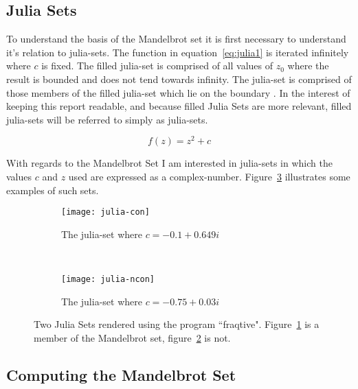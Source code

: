 \subsection*{Julia Sets}

To understand the basis of the Mandelbrot set it is first necessary to understand it's relation to \glspl{julia-set}.
The function in equation~\ref{eq:julia1} is iterated infinitely where \(c\) is fixed.
The \gls{filled julia-set} is comprised of all values of \(z_0\) where the result is bounded and does not tend towards infinity.
The \gls{julia-set} is comprised of those members of the \gls{filled julia-set} which lie on the boundary \cite{chaosfract}.
In the interest of keeping this report readable, and because filled Julia Sets are more relevant, \glspl{filled julia-set} will be 
referred to simply as \glspl{julia-set}.

\begin{equation}\label{eq:julia1}
f(z) = z^2 + c
\end{equation}

With regards to the Mandelbrot Set I am interested in \glspl{julia-set} in which the values \(c\) and \(z\) used are expressed as a 
\gls{complex-number}. Figure~\ref{fig:juliaimgs} illustrates some examples of such sets. 

\begin{figure}[h]
\centering
\begin{subfigure}[b]{0.48\textwidth}
  \centering    
  \texttt{[image: julia-con]}
  \caption{
    \tiny The \gls{julia-set} where \(c = -0.1 + 0.649i\)
  }
  \label{fig:juliaimgcon}
\end{subfigure}
~ %
\begin{subfigure}[b]{0.48\textwidth}
  \centering
  \texttt{[image: julia-ncon]}
  \caption{
    \tiny The \gls{julia-set} where \(c = -0.75 + 0.03i\)
  }
  \label{fig:juliaimgncon}
\end{subfigure}
\caption{
  Two Julia Sets rendered using the program ``fraqtive"\cite{fraqtive}. 
  Figure~\ref{fig:juliaimgcon} is a member of the Mandelbrot set, 
  figure~\ref{fig:juliaimgncon} is not.
}
\label{fig:juliaimgs}
\end{figure}

\subsection*{Computing the Mandelbrot Set}

